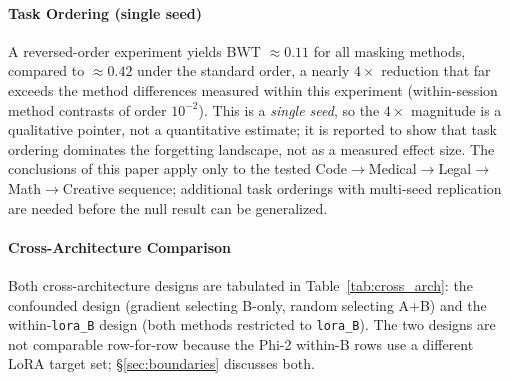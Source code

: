 \paragraph{Task Ordering (single seed)}
\label{app:task_order}

A reversed-order experiment yields BWT $\approx 0.11$ for all masking methods, compared to $\approx 0.42$ under the standard order, a nearly $4{\times}$ reduction that far exceeds the method differences measured within this experiment (within-session method contrasts of order $10^{-2}$). This is a \emph{single seed}, so the $4{\times}$ magnitude is a qualitative pointer, not a quantitative estimate; it is reported to show that task ordering dominates the forgetting landscape, not as a measured effect size. The conclusions of this paper apply only to the tested Code$\to$Medical$\to$Legal$\to$Math$\to$Creative sequence; additional task orderings with multi-seed replication are needed before the null result can be generalized.

\paragraph{Cross-Architecture Comparison}
\label{app:cross_arch}

Both cross-architecture designs are tabulated in Table~\ref{tab:cross_arch}: the confounded design (gradient selecting B-only, random selecting A+B) and the within-\texttt{lora\_B} design (both methods restricted to \texttt{lora\_B}). The two designs are not comparable row-for-row because the Phi-2 within-B rows use a different LoRA target set; \S\ref{sec:boundaries} discusses both.


